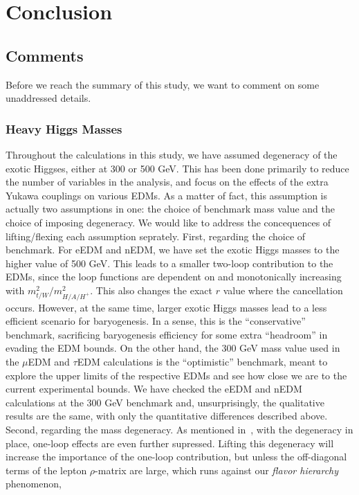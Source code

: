 \chapter{Conclusion}
\label{ch:conclusion}
\section{Comments}
Before we reach the summary of this study, we want to comment on some unaddressed details.

\subsection{Heavy Higgs Masses}
Throughout the calculations in this study, we have assumed degeneracy of the exotic Higgses, either at 300 or 500 GeV.
This has been done primarily to reduce the number of variables in the analysis, and focus on the effects of the extra Yukawa couplings on various EDMs.
As a matter of fact, this assumption is actually two assumptions in one: the choice of benchmark mass value and the choice of imposing degeneracy.
We would like to address the concequences of lifting/flexing each assumption seprately.
First, regarding the choice of benchmark.
For eEDM and nEDM, we have set the exotic Higgs masses to the higher value of 500 GeV.
This leads to a smaller two-loop contribution to the EDMs, since the loop functions are dependent on and monotonically increasing with \(m_{t/W}^{2}/m_{H/A/H^{+}}^{2} \).
This also changes the exact \(r \) value where the cancellation occurs.
However, at the same time, larger exotic Higgs masses lead to a less efficient scenario for baryogenesis.
In a sense, this is the ``conservative'' benchmark, sacrificing baryogenesis efficiency for some extra ``headroom'' in evading the EDM bounds.
On the other hand, the 300 GeV mass value used in the \(\mu \)EDM and \(\tau \)EDM calculations is the ``optimistic'' benchmark,
meant to explore the upper limits of the respective EDMs and see how close we are to the current experimental bounds.
We have checked the eEDM and nEDM calculations at the 300 GeV benchmark and, unsurprisingly, the qualitative results are the same, with only the quantitative differences described above.
Second, regarding the mass degeneracy.
As mentioned in~, with the degeneracy in place, one-loop effects are even further supressed.
Lifting this degeneracy will increase the importance of the one-loop contribution, but unless the off-diagonal terms of the lepton \(\rho \)-matrix are large,
which runs against our \textit{flavor hierarchy} phenomenon, 
